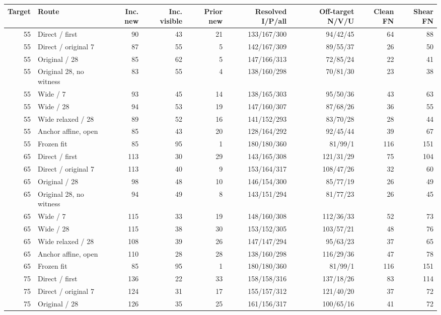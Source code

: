 \begin{tabular}{@{}rlrrrrrrr@{}}
\toprule
Target & Route & Inc. new & Inc. visible & Prior new & Resolved I/P/all & Off-target N/V/U & Clean FN & Shear FN \\
\midrule
55 & Direct / first & 90 & 43 & 21 & 133/167/300 & 94/42/45 & 64 & 88 \\
55 & Direct / original 7 & 87 & 55 & 5 & 142/167/309 & 89/55/37 & 26 & 50 \\
55 & Original / 28 & 85 & 62 & 5 & 147/166/313 & 72/85/24 & 22 & 41 \\
55 & Original 28, no witness & 83 & 55 & 4 & 138/160/298 & 70/81/30 & 23 & 38 \\
55 & Wide / 7 & 93 & 45 & 14 & 138/165/303 & 95/50/36 & 43 & 63 \\
55 & Wide / 28 & 94 & 53 & 19 & 147/160/307 & 87/68/26 & 36 & 55 \\
55 & Wide relaxed / 28 & 89 & 52 & 16 & 141/152/293 & 83/70/28 & 28 & 44 \\
55 & Anchor affine, open & 85 & 43 & 20 & 128/164/292 & 92/45/44 & 39 & 67 \\
55 & Frozen fit & 85 & 95 & 1 & 180/180/360 & 81/99/1 & 116 & 151 \\
65 & Direct / first & 113 & 30 & 29 & 143/165/308 & 121/31/29 & 75 & 104 \\
65 & Direct / original 7 & 113 & 40 & 9 & 153/164/317 & 108/47/26 & 32 & 60 \\
65 & Original / 28 & 98 & 48 & 10 & 146/154/300 & 85/77/19 & 26 & 49 \\
65 & Original 28, no witness & 94 & 49 & 8 & 143/151/294 & 81/77/23 & 26 & 45 \\
65 & Wide / 7 & 115 & 33 & 19 & 148/160/308 & 112/36/33 & 52 & 73 \\
65 & Wide / 28 & 115 & 38 & 30 & 153/152/305 & 103/57/21 & 48 & 76 \\
65 & Wide relaxed / 28 & 108 & 39 & 26 & 147/147/294 & 95/63/23 & 37 & 65 \\
65 & Anchor affine, open & 110 & 28 & 28 & 138/160/298 & 116/29/36 & 47 & 78 \\
65 & Frozen fit & 85 & 95 & 1 & 180/180/360 & 81/99/1 & 116 & 151 \\
75 & Direct / first & 136 & 22 & 33 & 158/158/316 & 137/18/26 & 83 & 114 \\
75 & Direct / original 7 & 124 & 31 & 17 & 155/157/312 & 121/40/20 & 37 & 72 \\
75 & Original / 28 & 126 & 35 & 25 & 161/156/317 & 100/65/16 & 41 & 72 \\

\end{tabular}
